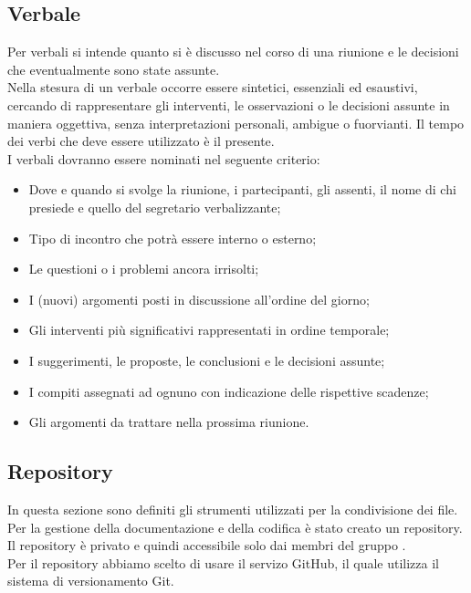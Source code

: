 	\subsection{Verbale}
Per verbali si intende quanto si è discusso nel corso di una riunione e le decisioni che eventualmente sono state assunte. \\
Nella stesura di un verbale occorre essere sintetici, essenziali ed esaustivi, cercando di rappresentare gli interventi, le osservazioni o le decisioni assunte in maniera oggettiva, senza interpretazioni personali, ambigue o fuorvianti. Il tempo dei verbi che deve essere utilizzato è il presente.\\
I verbali dovranno essere nominati nel seguente criterio: 
\begin{itemize}
	\item Dove e quando si svolge la riunione, i partecipanti, gli assenti, il nome di chi presiede e quello del segretario verbalizzante;
	\item Tipo di incontro che potrà essere interno o esterno;
	\item Le questioni o i problemi ancora irrisolti;
	\item I (nuovi) argomenti posti in discussione all'ordine del giorno;
	\item Gli interventi più significativi rappresentati in ordine temporale; 
	\item I suggerimenti, le proposte, le conclusioni e le decisioni assunte; 
	\item I compiti assegnati ad ognuno con indicazione delle rispettive scadenze; 
	\item Gli argomenti da trattare nella prossima riunione. 
\end{itemize}

	\subsection{Repository}
In questa sezione sono definiti gli strumenti utilizzati per la condivisione dei file. \\
Per la gestione della documentazione e della codifica è stato creato un \gls{repository}. Il \gls{repository} è privato e quindi accessibile solo dai membri del gruppo \GRUPPO.\\
Per il \gls{repository} abbiamo scelto di usare il servizo \gls{GitHub}, il quale utilizza il sistema di versionamento \gls{Git}.
